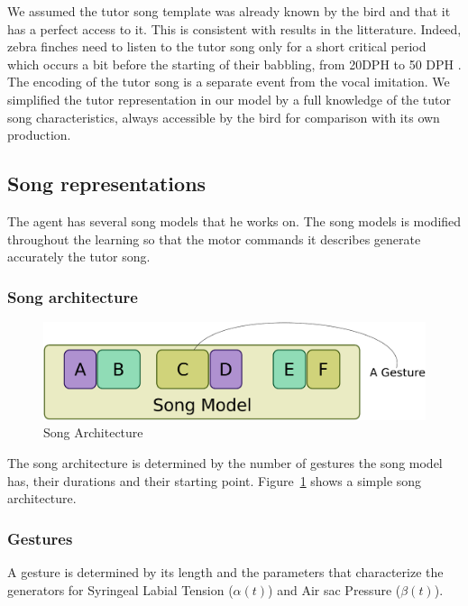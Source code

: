 {We assumed the tutor song template was already known by the bird and that it has
a perfect access to it. This is consistent with results in the litterature.
Indeed, zebra finches need to listen to the tutor song only for a short critical
period which occurs a bit before the starting of their babbling, from 20DPH to
50 DPH \parencite{deregnaucourt_how_2005, margoliash_sleep_2010}. The encoding
of the tutor song is a separate event from the vocal imitation. We simplified
the tutor representation in our model by a full knowledge of the tutor song
characteristics, always accessible by the bird for comparison with its own
production.

\subsection{Song representations}

The agent has several song models that he works on. The song models is modified
throughout the learning so that the motor commands it describes generate
accurately the tutor song.

\subsubsection{Song architecture}

\begin{figure}
\center
\includegraphics[width=0.8\linewidth]{song_model_architecture_schema}
\caption{Song Architecture\label{fig_song_arch}}
\end{figure}

The song architecture is determined by the number of gestures the song model
has, their durations and their starting point. Figure~\ref{fig_song_arch} shows
a simple song architecture.

\subsubsection{Gestures}

A gesture is determined by its length and the parameters that characterize the
generators for Syringeal Labial Tension (\(\alpha(t)\)) and Air sac Pressure
(\(\beta(t)\)).

}
